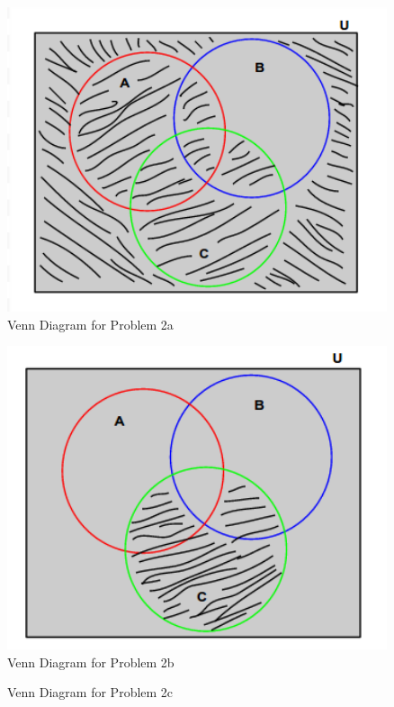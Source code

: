 \documentclass[a4paper,11pt]{article}
\begin{document}
  \begin{figure}
     \includegraphics[width=4.4in]{2Avenn}
   \caption{Venn Diagram for Problem 2a}
   \label{fig:tutorial}
  \end{figure} 

    \begin{figure}
     \includegraphics[width=4.4in]{2Bvenn}
   \caption{Venn Diagram for Problem 2b}
   \label{fig:tutorial}
  \end{figure} 

    \begin{figure}
   \caption{Venn Diagram for Problem 2c}
   \label{fig:tutorial}
  \end{figure} 
\end{document}
